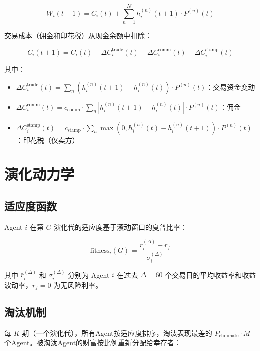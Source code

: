 \begin{equation}
W_i(t+1) = C_i(t) + \sum_{n=1}^{N} h_i^{(n)}(t+1) \cdot P^{(n)}(t)
\label{eq:wealth_update}
\end{equation}

交易成本（佣金和印花税）从现金余额中扣除：

\begin{equation}
C_i(t+1) = C_i(t) - \Delta C_i^{\text{trade}}(t) - \Delta C_i^{\text{comm}}(t) - \Delta C_i^{\text{stamp}}(t)
\label{eq:cash_update}
\end{equation}

其中：
\begin{itemize}
    \item $\Delta C_i^{\text{trade}}(t) = \sum_n (h_i^{(n)}(t+1) - h_i^{(n)}(t)) \cdot P^{(n)}(t)$：交易资金变动
    \item $\Delta C_i^{\text{comm}}(t) = c_{\text{comm}} \cdot \sum_n |h_i^{(n)}(t+1) - h_i^{(n)}(t)| \cdot P^{(n)}(t)$：佣金
    \item $\Delta C_i^{\text{stamp}}(t) = c_{\text{stamp}} \cdot \sum_n \max(0, h_i^{(n)}(t) - h_i^{(n)}(t+1)) \cdot P^{(n)}(t)$：印花税（仅卖方）
\end{itemize}

\section{演化动力学}

\subsection{适应度函数}

Agent $i$ 在第 $G$ 演化代的适应度基于滚动窗口的夏普比率：

\begin{equation}
\text{fitness}_i(G) = \frac{\bar{r}_i^{(\Delta)} - r_f}{\sigma_i^{(\Delta)}}
\label{eq:fitness}
\end{equation}

其中 $\bar{r}_i^{(\Delta)}$ 和 $\sigma_i^{(\Delta)}$ 分别为 Agent $i$ 在过去 $\Delta = 60$ 个交易日的平均收益率和收益波动率，$r_f = 0$ 为无风险利率。

\subsection{淘汰机制}

每 $K$ 期（一个演化代），所有Agent按适应度排序，淘汰表现最差的 $P_{\text{eliminate}} \cdot M$ 个Agent。被淘汰Agent的财富按比例重新分配给幸存者：


